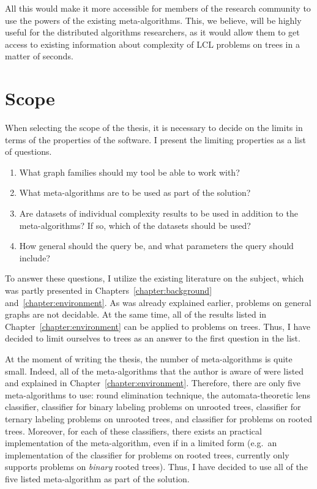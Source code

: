 All this would make it more accessible for members of the research
community to use the powers of the existing meta-algorithms.
This, we believe, will be highly useful for the distributed
algorithms researchers, as it would allow them to get access
to existing information about complexity of LCL problems on trees
in a matter of seconds.

\section{Scope}

When selecting the scope of the thesis, it is necessary
to decide on the limits
in terms of the properties of the software. I present the limiting properties
as a list of questions.

\begin{enumerate}
  \item What graph families should my tool be able to work with?
  \item What meta-algorithms are to be used as part of the solution?
  \item Are datasets of individual complexity results to be used
  in addition to the meta-algorithms? If so, which of the datasets should be used?
  \item How general should the query be, and what parameters the query should include?
\end{enumerate}

To answer these questions, I utilize the existing literature on the subject, which was partly presented in Chapters~\ref{chapter:background} and~\ref{chapter:environment}. As was already explained earlier, problems on general graphs are not decidable. At the same time, all of the results listed in Chapter~\ref{chapter:environment} can be applied to problems on trees. Thus,
I have decided to limit ourselves to trees as an answer to the first question in the list.

At the moment of writing the thesis, the number of meta-algorithms is
quite small. Indeed, all of the meta-algorithms that the author is aware of were listed and explained in Chapter~\ref{chapter:environment}. Therefore, there are only five meta-algorithms to use: round elimination technique, the automata-theoretic lens classifier, classifier for binary labeling problems on unrooted trees, classifier for ternary labeling problems on unrooted trees, and classifier for problems on rooted trees. Moreover, for each of these classifiers, there exists an practical implementation of the meta-algorithm, even if in a limited form (e.g.\ an implementation of the classifier for problems on rooted trees, currently only supports problems on \emph{binary} rooted trees). Thus, I have decided to use all of the five listed meta-algorithm as part of the solution.

